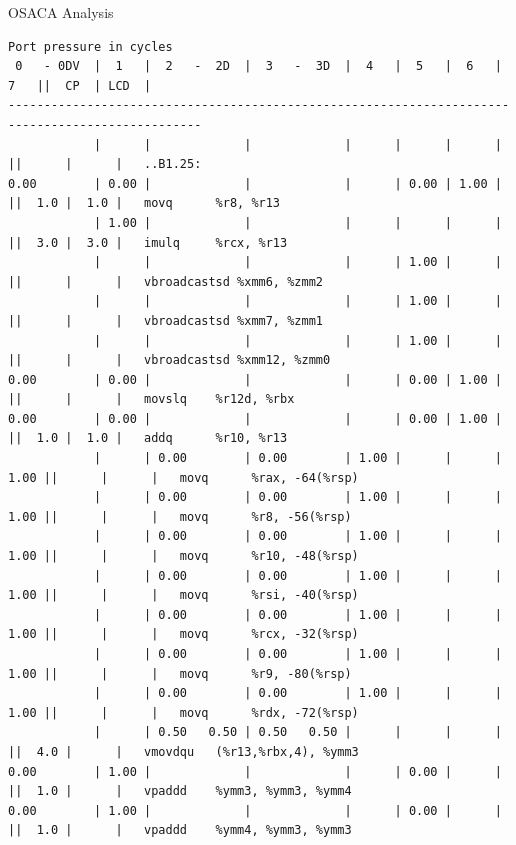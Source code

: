 \documentclass[aspectratio=169,t]{beamer}
\begin{document}
  \begin{frame}[fragile]{OSACA Analysis}
    \vspace{-20pt}
    \begin{lstlisting}[basicstyle=\tt\fontsize{4pt}{6pt}\selectfont]
                                     Port pressure in cycles
 0   - 0DV  |  1   |  2   -  2D  |  3   -  3D  |  4   |  5   |  6   |  7   ||  CP  | LCD  |
-------------------------------------------------------------------------------------------------
            |      |             |             |      |      |      |      ||      |      |   ..B1.25:
0.00        | 0.00 |             |             |      | 0.00 | 1.00 |      ||  1.0 |  1.0 |   movq      %r8, %r13
            | 1.00 |             |             |      |      |      |      ||  3.0 |  3.0 |   imulq     %rcx, %r13
            |      |             |             |      | 1.00 |      |      ||      |      |   vbroadcastsd %xmm6, %zmm2
            |      |             |             |      | 1.00 |      |      ||      |      |   vbroadcastsd %xmm7, %zmm1
            |      |             |             |      | 1.00 |      |      ||      |      |   vbroadcastsd %xmm12, %zmm0
0.00        | 0.00 |             |             |      | 0.00 | 1.00 |      ||      |      |   movslq    %r12d, %rbx
0.00        | 0.00 |             |             |      | 0.00 | 1.00 |      ||  1.0 |  1.0 |   addq      %r10, %r13
            |      | 0.00        | 0.00        | 1.00 |      |      | 1.00 ||      |      |   movq      %rax, -64(%rsp)
            |      | 0.00        | 0.00        | 1.00 |      |      | 1.00 ||      |      |   movq      %r8, -56(%rsp)
            |      | 0.00        | 0.00        | 1.00 |      |      | 1.00 ||      |      |   movq      %r10, -48(%rsp)
            |      | 0.00        | 0.00        | 1.00 |      |      | 1.00 ||      |      |   movq      %rsi, -40(%rsp)
            |      | 0.00        | 0.00        | 1.00 |      |      | 1.00 ||      |      |   movq      %rcx, -32(%rsp)
            |      | 0.00        | 0.00        | 1.00 |      |      | 1.00 ||      |      |   movq      %r9, -80(%rsp)
            |      | 0.00        | 0.00        | 1.00 |      |      | 1.00 ||      |      |   movq      %rdx, -72(%rsp)
            |      | 0.50   0.50 | 0.50   0.50 |      |      |      |      ||  4.0 |      |   vmovdqu   (%r13,%rbx,4), %ymm3
0.00        | 1.00 |             |             |      | 0.00 |      |      ||  1.0 |      |   vpaddd    %ymm3, %ymm3, %ymm4
0.00        | 1.00 |             |             |      | 0.00 |      |      ||  1.0 |      |   vpaddd    %ymm4, %ymm3, %ymm3

\end{lstlisting}
\end{frame}
\end{document}
